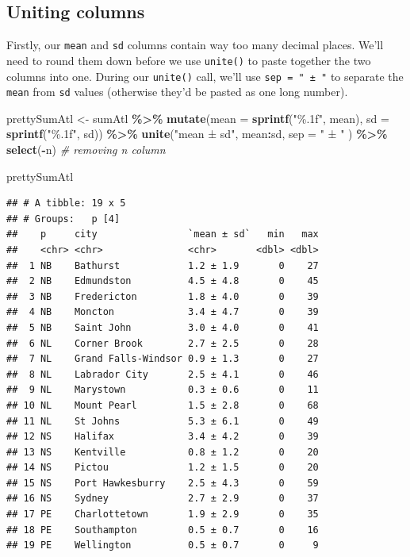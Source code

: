 \documentclass[
]{book}
\newenvironment{Shaded}{\begin{snugshade}}{\end{snugshade}}
\newcommand{\AttributeTok}[1]{\textcolor[rgb]{0.13,0.29,0.53}{#1}}
\newcommand{\CommentTok}[1]{\textcolor[rgb]{0.56,0.35,0.01}{\textit{#1}}}
\newcommand{\FunctionTok}[1]{\textcolor[rgb]{0.13,0.29,0.53}{\textbf{#1}}}
\newcommand{\NormalTok}[1]{#1}
\newcommand{\OtherTok}[1]{\textcolor[rgb]{0.56,0.35,0.01}{#1}}
\newcommand{\SpecialCharTok}[1]{\textcolor[rgb]{0.81,0.36,0.00}{\textbf{#1}}}
\newcommand{\StringTok}[1]{\textcolor[rgb]{0.31,0.60,0.02}{#1}}
\begin{document}
\hypertarget{uniting-columns}{%
\subsection{Uniting columns}\label{uniting-columns}}

Firstly, our \texttt{mean} and \texttt{sd} columns contain way too many decimal places. We'll need to round them down before we use \texttt{unite()} to paste together the two columns into one. During our \texttt{unite()} call, we'll use \texttt{sep\ =\ "\ ±\ "} to separate the \texttt{mean} from \texttt{sd} values (otherwise they'd be pasted as one long number).

\begin{Shaded}
\begin{Highlighting}[]
\NormalTok{prettySumAtl }\OtherTok{\textless{}{-}}\NormalTok{ sumAtl }\SpecialCharTok{\%\textgreater{}\%}
  \FunctionTok{mutate}\NormalTok{(}\AttributeTok{mean =} \FunctionTok{sprintf}\NormalTok{(}\StringTok{"\%.1f"}\NormalTok{, mean), }
         \AttributeTok{sd =} \FunctionTok{sprintf}\NormalTok{(}\StringTok{"\%.1f"}\NormalTok{, sd)) }\SpecialCharTok{\%\textgreater{}\%}
  \FunctionTok{unite}\NormalTok{(}\StringTok{"mean ± sd"}\NormalTok{, mean}\SpecialCharTok{:}\NormalTok{sd, }\AttributeTok{sep =} \StringTok{" ± "}\NormalTok{ ) }\SpecialCharTok{\%\textgreater{}\%}
  \FunctionTok{select}\NormalTok{(}\SpecialCharTok{{-}}\NormalTok{n) }\CommentTok{\# removing n column}

\NormalTok{prettySumAtl}
\end{Highlighting}
\end{Shaded}

\begin{verbatim}
## # A tibble: 19 x 5
## # Groups:   p [4]
##    p     city                `mean ± sd`   min   max
##    <chr> <chr>               <chr>       <dbl> <dbl>
##  1 NB    Bathurst            1.2 ± 1.9       0    27
##  2 NB    Edmundston          4.5 ± 4.8       0    45
##  3 NB    Fredericton         1.8 ± 4.0       0    39
##  4 NB    Moncton             3.4 ± 4.7       0    39
##  5 NB    Saint John          3.0 ± 4.0       0    41
##  6 NL    Corner Brook        2.7 ± 2.5       0    28
##  7 NL    Grand Falls-Windsor 0.9 ± 1.3       0    27
##  8 NL    Labrador City       2.5 ± 4.1       0    46
##  9 NL    Marystown           0.3 ± 0.6       0    11
## 10 NL    Mount Pearl         1.5 ± 2.8       0    68
## 11 NL    St Johns            5.3 ± 6.1       0    49
## 12 NS    Halifax             3.4 ± 4.2       0    39
## 13 NS    Kentville           0.8 ± 1.2       0    20
## 14 NS    Pictou              1.2 ± 1.5       0    20
## 15 NS    Port Hawkesburry    2.5 ± 4.3       0    59
## 16 NS    Sydney              2.7 ± 2.9       0    37
## 17 PE    Charlottetown       1.9 ± 2.9       0    35
## 18 PE    Southampton         0.5 ± 0.7       0    16
## 19 PE    Wellington          0.5 ± 0.7       0     9
\end{verbatim}
\end{document}
